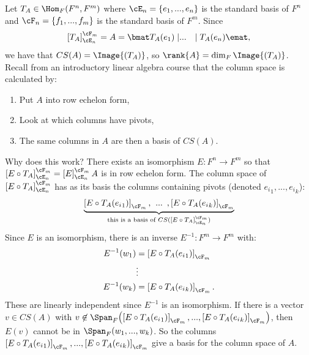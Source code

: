     \begin{example}
        Let $T_A \in \Hom_F{(F^n,F^m)}$ where $\cE_n = \{e_1,...,e_n\}$ is the standard basis of $F^n$ and $\cF_n = \{f_1,...,f_m\}$ is the standard basis of $F^m$. Since
            \begin{equation*}
            \begin{split}
                \left[T_A\right]_{\cE_n}^{\cF_m} = A = \bmat T_A(e_1) \mid & ... & \mid T_A(e_n) \emat,
            \end{split}
            \end{equation*}
        we have that $CS(A) = \Image{(T_A)}$, so $\rank{A} = \dim_F{\Image{(T_A)}}$. Recall from an introductory linear algebra course that the column space is calculated by:
            \begin{enumerate}[label = (\alph*)]
                \item Put $A$ into row echelon form,
                \item Look at which columns have pivots,
                \item The same columns in $A$ are then a basis of $CS(A)$.
            \end{enumerate}
        Why does this work? There exists an isomorphism $E:F^n \rightarrow F^m$ so that $\left[E \circ T_A\right]_{\cE_n}^{\cF_m} = \left[E\right]_{\cE_n}^{\cF_m} A$   is in row echelon form. The column space of $\left[E \circ T_A\right]_{\cE_n}^{\cF_m}$ has as its basis the columns containing pivots (denoted ${e_i}_1,...,{e_i}_k$):
            \begin{equation*}
            \begin{split}
                \underbrace{\left[E \circ T_A({e_i}_1)\right]_{\cF_m}, \hspace{4pt}... \hspace{5pt},\left[E \circ T_A({e_i}_k)\right]_{\cF_m}}_{\text{this is a basis of $CS(\left[E \circ T_A\right]_{\cE_n}^{\cF_m})$}}
            \end{split}
            \end{equation*}
        Since $E$ is an isomorphism, there is an inverse $E^{-1}:F^m \rightarrow F^m$ with:
            \begin{equation*}
            \begin{split}
                E^{-1}(w_1) &= \left[E \circ T_A({e_i}_1)\right]_{\cF_m} \\
                &\vdots \\
                E^{-1}(w_k) & = \left[E \circ T_A({e_i}_k)\right]_{\cF_m}.
            \end{split}
            \end{equation*}
        These are linearly independent since $E^{-1}$ is an isomorphism. If there is a vector $v \in CS(A)$ with \newline$v \not\in \Span_F{\left(\left[E \circ T_A({e_i}_1)\right]_{\cF_m}, ... ,\left[E \circ T_A({e_i}_k)\right]_{\cF_m}\right)}$, then $E(v)$ cannot be in $\Span_F{(w_1,...,w_k)}$. So the columns \newline $\left[E \circ T_A({e_i}_1)\right]_{\cF_m}, ... ,\left[E \circ T_A({e_i}_k)\right]_{\cF_m}$ give a basis for the column space of $A$.
    \end{example}

